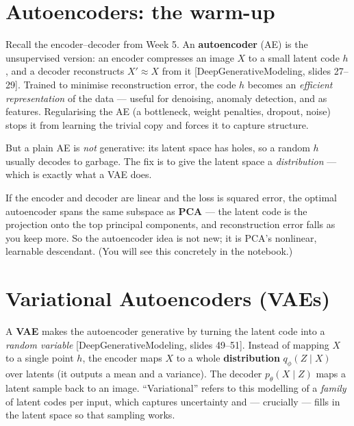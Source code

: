 \documentclass[11pt]{article}
\newcommand{\deck}[1]{\textsf{\small[#1]}}
\begin{document}
\section{Autoencoders: the warm-up}

Recall the encoder--decoder from Week 5. An \textbf{autoencoder} (AE) is the
unsupervised version: an encoder compresses an image $X$ to a small latent code
$h$, and a decoder reconstructs $X'\approx X$ from it
\deck{DeepGenerativeModeling, slides 27--29}. Trained to minimise reconstruction
error, the code $h$ becomes an \emph{efficient representation} of the data ---
useful for denoising, anomaly detection, and as features. Regularising the AE
(a bottleneck, weight penalties, dropout, noise) stops it from learning the
trivial copy and forces it to capture structure.

But a plain AE is \emph{not} generative: its latent space has holes, so a random
$h$ usually decodes to garbage. The fix is to give the latent space a
\emph{distribution} --- which is exactly what a VAE does.

\begin{notebox}
If the encoder and decoder are linear and the loss is squared error, the optimal
autoencoder spans the same subspace as \textbf{PCA} --- the latent code is the
projection onto the top principal components, and reconstruction error falls as
you keep more. So the autoencoder idea is not new; it is PCA's nonlinear,
learnable descendant. (You will see this concretely in the notebook.)
\end{notebox}

\section{Variational Autoencoders (VAEs)}

A \textbf{VAE} makes the autoencoder generative by turning the latent code into a
\emph{random variable} \deck{DeepGenerativeModeling, slides 49--51}. Instead of
mapping $X$ to a single point $h$, the encoder maps $X$ to a whole
\textbf{distribution} $q_\phi(Z\mid X)$ over latents (it outputs a mean and a
variance). The decoder $p_\theta(X\mid Z)$ maps a latent sample back to an image.
``Variational'' refers to this modelling of a \emph{family} of latent codes per
input, which captures uncertainty and --- crucially --- fills in the latent space
so that sampling works.
\end{document}
